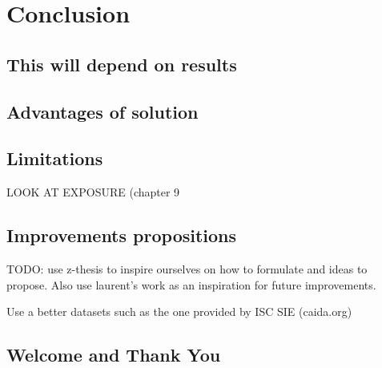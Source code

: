 
\chapter{Conclusion} %

\label{Conclusion} %

\section{This will depend on results}
\section{Advantages of solution}
\section{Limitations}
LOOK AT EXPOSURE (chapter 9
\section{Improvements propositions}
TODO: use z-thesis to inspire ourselves on how to formulate and ideas to propose.
Also use laurent's work as an inspiration for future improvements.

Use a better datasets such as the one provided by ISC SIE (caida.org)
\section{Welcome and Thank You}
